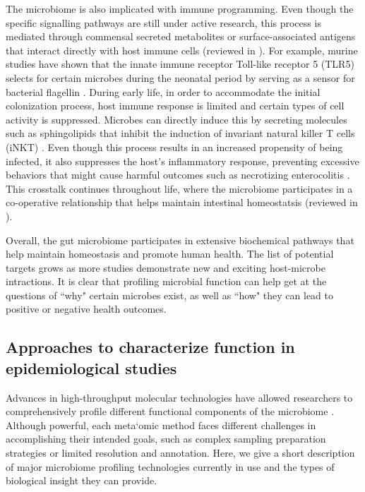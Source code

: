 The microbiome is also implicated with immune programming. Even though the specific signalling pathways are still under active research, this process is mediated through commensal secreted metabolites or surface-associated antigens that interact directly with host immune cells (reviewed in \cite{belkaid2014role}). For example, murine studies have shown that the innate immune receptor Toll-like receptor 5 (TLR5) selects for certain microbes during the neonatal period by serving as a sensor for bacterial flagellin \cite{fulde2018neonatal}. During early life, in order to accommodate the initial colonization process, host immune response is limited and certain types of cell activity is suppressed. Microbes can directly induce this by secreting molecules such as sphingolipids that inhibit the induction of invariant natural killer T cells (iNKT) \cite{an2014sphingolipids}. Even though this process results in an increased propensity of being infected, it also suppresses the host's inflammatory response, preventing excessive behaviors that might cause harmful outcomes such as necrotizing enterocolitis \cite{neu2011necrotizing}. This crosstalk continues throughout life, where the microbiome participates in a co-operative relationship that helps maintain intestinal homeostatsis (reviewed in \cite{zheng2020interaction}). 

Overall, the gut microbiome participates in extensive biochemical pathways that help maintain homeostasis and promote human health. The list of potential targets grows as more studies demonstrate new and exciting host-microbe intractions. It is clear that profiling microbial function can help get at the questions of ``why" certain microbes exist, as well as ``how" they can lead to positive or negative health outcomes.  

\subsection{Approaches to characterize function in epidemiological studies}

Advances in high-throughput molecular technologies have allowed researchers to comprehensively profile different functional components of the microbiome \cite{foxman2015use}. Although powerful, each meta`omic method faces different challenges in accomplishing their intended goals, such as complex sampling preparation strategies or limited resolution and annotation. Here, we give a short description of major microbiome profiling technologies currently in use and the types of biological insight they can provide.  

